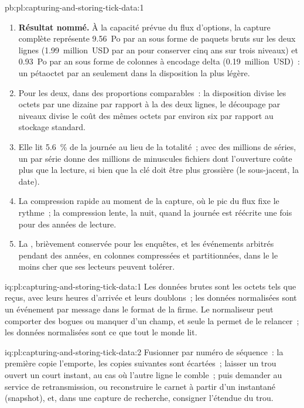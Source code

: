 \begin{solution}{pb:pl:capturing-and-storing-tick-data:1}
\begin{enumerate}
\item \textbf{Résultat nommé.} À la capacité prévue du flux d'options, la capture complète représente 9.56~Po par an sous forme de paquets bruts sur les deux lignes
(1.99~million~USD par an pour conserver cinq ans sur trois niveaux) et 0.93~Po par an sous forme de colonnes à encodage delta (0.19~million~USD)~: un
pétaoctet par an seulement dans la disposition la plus légère.
\item Pour les deux, dans des proportions comparables~: la disposition divise les octets par une dizaine par rapport à la  des deux lignes, le découpage par niveaux divise le
coût des mêmes octets par environ six par rapport au stockage standard.
\item Elle lit 5.6~\% de la journée au lieu de la totalité~; avec des millions de séries, un  par série donne des millions de minuscules
fichiers dont l'ouverture coûte plus que la lecture, si bien que la clé doit être plus grossière (le sous-jacent, la date).
\item La compression rapide au moment de la capture, où le pic du flux fixe le rythme~; la compression lente, la nuit, quand la journée est réécrite une fois
pour des années de lecture.
\item La , brièvement conservée pour les enquêtes, et les événements arbitrés pendant des années, en colonnes compressées et partitionnées, dans le
 le moins cher que ses lecteurs peuvent tolérer.
\end{enumerate}
\end{solution}

\begin{solution}{iq:pl:capturing-and-storing-tick-data:1}
Les données brutes sont les octets tels que reçus, avec leurs heures d'arrivée et leurs doublons~; les données normalisées sont un événement par message dans le
format de la firme. Le normaliseur peut comporter des bogues ou manquer d'un champ, et seule la  permet de le relancer~; les données normalisées sont ce que
tout le monde lit.
\end{solution}

\begin{solution}{iq:pl:capturing-and-storing-tick-data:2}
Fusionner par numéro de séquence~: la première copie l'emporte, les copies suivantes sont écartées~; laisser un trou ouvert un court instant, au cas où l'autre ligne
le comble~; puis demander au service de retransmission, ou reconstruire le carnet à partir d'un instantané (snapshot), et, dans une capture de recherche, consigner l'étendue du trou.
\end{solution}

